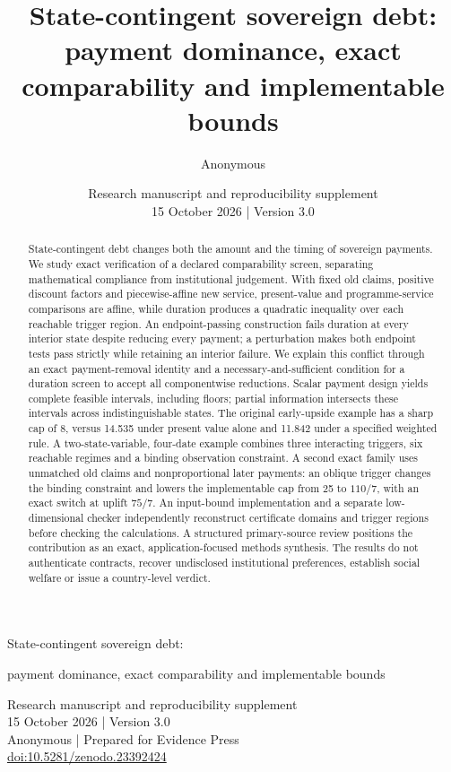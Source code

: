 \documentclass[11pt,a4paper]{article}
\title{State-contingent sovereign debt:\\payment dominance, exact comparability and implementable bounds}
\author{Anonymous}
\date{Research manuscript and reproducibility supplement\\15 October 2026 \quad | \quad Version 3.0}
\begin{document}
\begin{center}
{\LARGE State-contingent sovereign debt:\par}
\vspace{6pt}
{\Large payment dominance, exact comparability and implementable bounds\par}
\vspace{12pt}
Research manuscript and reproducibility supplement\\
15 October 2026 \quad | \quad Version 3.0\\
Anonymous \quad | \quad Prepared for Evidence Press\\
\href{https://doi.org/10.5281/zenodo.23392424}{doi:10.5281/zenodo.23392424}
\end{center}
\begin{abstract}
State-contingent debt changes both the amount and the timing of sovereign payments. We study exact verification of a declared comparability screen, separating mathematical compliance from institutional judgement. With fixed old claims, positive discount factors and piecewise-affine new service, present-value and programme-service comparisons are affine, while duration produces a quadratic inequality over each reachable trigger region. An endpoint-passing construction fails duration at every interior state despite reducing every payment; a perturbation makes both endpoint tests pass strictly while retaining an interior failure. We explain this conflict through an exact payment-removal identity and a necessary-and-sufficient condition for a duration screen to accept all componentwise reductions. Scalar payment design yields complete feasible intervals, including floors; partial information intersects these intervals across indistinguishable states. The original early-upside example has a sharp cap of 8, versus 14.535 under present value alone and 11.842 under a specified weighted rule. A two-state-variable, four-date example combines three interacting triggers, six reachable regimes and a binding observation constraint. A second exact family uses unmatched old claims and nonproportional later payments: an oblique trigger changes the binding constraint and lowers the implementable cap from 25 to $110/7$, with an exact switch at uplift $75/7$. An input-bound implementation and a separate low-dimensional checker independently reconstruct certificate domains and trigger regions before checking the calculations. A structured primary-source review positions the contribution as an exact, application-focused methods synthesis. The results do not authenticate contracts, recover undisclosed institutional preferences, establish social welfare or issue a country-level verdict.
\end{abstract}
\setcounter{tocdepth}{1}
\begingroup\small\setlength{\parskip}{0pt}
\let\originaladdvspace\addvspace
\renewcommand{\addvspace}[1]{\originaladdvspace{2pt}}
\tableofcontents
\endgroup
\newpage
\end{document}
